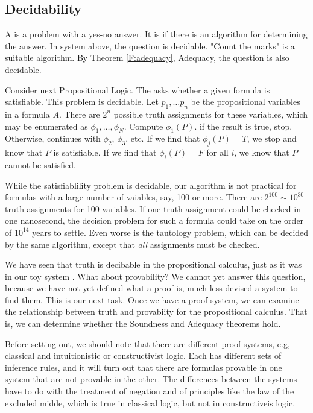 \subsection{Decidability}



A  is a problem with a yes-no answer.  It is  if there is an algorithm for determining the answer.  In system  above, the question  is decidable.  "Count the marks" is  a suitable algorithm.  By Theorem \ref{F:adequacy}, Adequacy, the question  is also decidable.


Consider next Propositional Logic.  The  asks whether a given formula is satisfiable.  This problem is decidable.  Let $p_1, \ldots p_n$ be the propositional variables in a formula $A$.  There are $2^n$ possible truth assignments for these variables, which may be enumerated as $\phi_1, \ldots, \phi_N$.  Compute $\phi_1(P)$.  if the result is true, stop.  Otherwise, continues with $\phi_2$, $\phi_3$, etc. If we find that $\phi_j(P) = T$, we stop and know that $P$ is satisfiable.  If we find that $\phi_i(P) = F$ for all $i$, we know that $P$ cannot be satisfied.

While the satisfiablility problem is decidable, our algorithm is not practical for formulas with a large number of vaiables, say, 100 or more.  There are
$2^{100} \sim 10^{30}$ truth assignments for 100 variables.  If one truth assignment could be checked in one nanosecond, the decision problem for such a formula could take on the order of $10^{14}$  years to settle.  Even worse is the tautology problem, which can be decided by the same algorithm, except that \emph{all} assignments must be checked.

We have seen that truth is decibable in the propositional calculus, just as it was in our toy system .  What about provability?  We cannot yet answer this question, because we have not yet defined what a proof is, much less devised a system to find them.  This is our next task.  Once we have a proof system, we can examine the relationship between truth and provabiity for the propositional calculus.  That is, we can determine whether the Soundness and Adequacy theorems hold.


Before setting out, we should note that there are different proof systems, e.g,  classical and intuitionistic or constructivist logic.  Each has different sets of inference rules, and it will turn out that there are formulas provable in one system that are not provable in the other.  The differences between the systems have to do with the treatment of negation and of principles like the law of the excluded midde, which is true in classical logic, but not in constructiveis logic.


